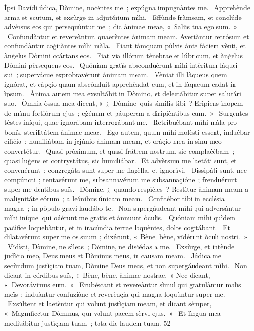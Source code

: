 { Ìpsi Davídi}
{%
údica, Dòmine, noċèntes me~; expúgna impugnàntes me. 
~Apprehènde arma et scutum, et exsùrge in adjutórium mìhi. 
~Effùnde fràmeam, et conclúde advèrsus eos qui persequùntur me~; dic ànimae meae, «~Salüs tua ego sum.~»
~Confundàntur et revereàntur, quaerèntes ànimam meam. Avertàntur retrósum et confundàntur coġitàntes mìhi màla. 
~Fiant tàmquam pùlvis ànte fàċiem vènti, et ànġelus Dòmini coártans eos. 
~Fiat via illórum tènebrae et lúbricum, et ànġelus Dòmini pèrsequens eos. 
~Quóniam gratïs absconduérunt mìhi intèritum làquei sui~; supervácue exprobravérunt ànimam meam. 
~Vèniat illi làqueus quem ignórat, et càpçio quam abscònduit apprehèndat eum, et in làqueum cadat in ìpsum. 
~Ànima autem mea exsultábit in Dòmino, et delectábitur super salutári suo. 
~Òmnia òssua mea dicent, «~¿~Dòmine, quìs sìmilis tìbi~? Erìpiens ìnopem de mànu fortiórum ejus~; eġénum et páuperem a diripièntibus eum.~» 
~Surgèntes tèstes iníqui, quae ignorábam interrogábant me. 
~Retribuébant mìhi màla pro bonïs, sterilitátem ànimae meae. 
~Ego autem, quum mìhi molèsti essent, induébar cilìċio~; humiliábam in jejúnio ànimam meam, et oráçio mea in sìnu meo convertétur. 
~Quasi pròximum, et quasi frátrem nostrum, sic complaċébam~; quasi luġens et contrystátus, sic humiliábar. 
~Et advèrsum me laetáti sunt, et convenérunt~; congregáta sunt super me flagèlla, et ignorávi. 
~Dissipáti sunt, nec compúncti~; tentavérunt me, subsannavérunt me subsannaçióne~; frenduérunt super me dèntibus suïs. 
~Dòmine, ¿~quando respìċies~? Restìtue ànimam meam a malignitáte eórum~; a leónibus únicam meam. 
~Confitébor tìbi in ecclésia magna~; in pòpulo gravi laudábo te. 
~Non supergáudeant mìhi qui adversàntur mìhi iníque, qui odérunt me gratïs et ànnuunt òculïs. 
~Quóniam mìhi quìdem paċìfice loquebàntur, et in iracùndia terrae loquèntes, dolos coġitábant. 
~Et dilatavérunt super me os suum~; dixérunt, «~Bène, bène, vïdérunt òculi nostri.~»
~Vïdìsti, Dòmine, ne sìleas~; Dòmine, ne disċédas a me. 
~Exsùrge, et intènde judìċio meo, Deus meus et Dòminus meus, in causam meam. 
~Júdica me secùndum justìçiam tuam, Dòmine Deus meus, et non supergáudeant mìhi. 
~Non dicant in córdibus suïs, «~Bène, bène, ànimae nostrae.~» Nec dicant, «~Devorávimus eum.~»
~Erubéscant et revereàntur sìmul qui gratulàntur malïs meïs~; induàntur confuzióne et reverènçia qui magna loquùntur super me. 
~Exsùltent et laetèntur qui volunt justìçiam meam, et dicant sèmper, «~Magnificétur Dòminus, qui volunt paċem sèrvi ejus.~»
~Et lìngüa mea meditábitur justìçiam tuam~; tota die laudem tuam. 
}
{5}{2}
